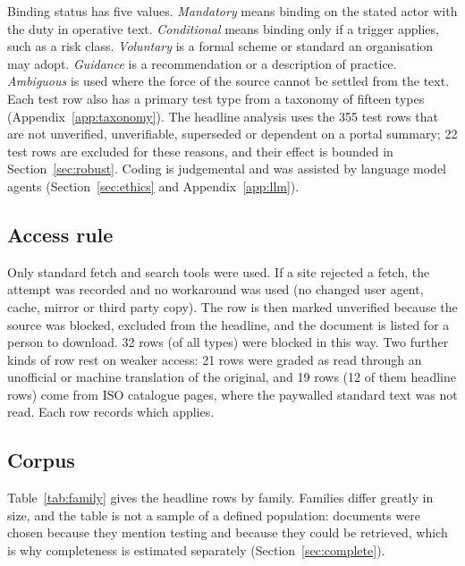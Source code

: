 \documentclass[conference]{IEEEtran}
\begin{document}
Binding status has five values. \emph{Mandatory} means binding on the stated actor with the duty in operative text. \emph{Conditional} means binding only if a trigger applies, such as a risk class. \emph{Voluntary} is a formal scheme or standard an organisation may adopt. \emph{Guidance} is a recommendation or a description of practice. \emph{Ambiguous} is used where the force of the source cannot be settled from the text. Each test row also has a primary test type from a taxonomy of fifteen types (Appendix~\ref{app:taxonomy}). The headline analysis uses the 355 test rows that are not unverified, unverifiable, superseded or dependent on a portal summary; 22 test rows are excluded for these reasons, and their effect is bounded in Section~\ref{sec:robust}. Coding is judgemental and was assisted by language model agents (Section~\ref{sec:ethics} and Appendix~\ref{app:llm}).

\subsection{Access rule}
Only standard fetch and search tools were used. If a site rejected a fetch, the attempt was recorded and no workaround was used (no changed user agent, cache, mirror or third party copy). The row is then marked unverified because the source was blocked, excluded from the headline, and the document is listed for a person to download. 32 rows (of all types) were blocked in this way. Two further kinds of row rest on weaker access: 21 rows were graded as read through an unofficial or machine translation of the original, and 19 rows (12 of them headline rows) come from ISO catalogue pages, where the paywalled standard text was not read. Each row records which applies.

\subsection{Corpus}
Table~\ref{tab:family} gives the headline rows by family. Families differ greatly in size, and the table is not a sample of a defined population: documents were chosen because they mention testing and because they could be retrieved, which is why completeness is estimated separately (Section~\ref{sec:complete}).
\end{document}
